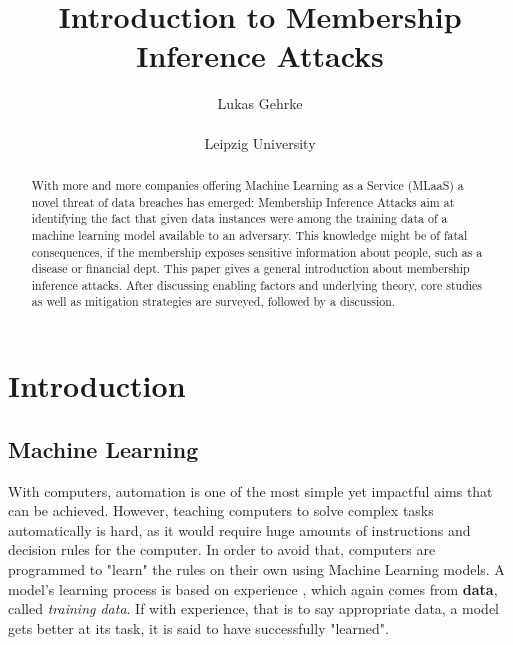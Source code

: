 \documentclass[runningheads]{llncs}
\begin{document}
%
\title{Introduction to Membership Inference Attacks}
%
%
\author{Lukas Gehrke \\
 \\
Leipzig University \\
}
%
%
%

\maketitle
%

\tableofcontents
\newpage

\begin{abstract} 
    With more and more companies offering Machine Learning as a Service (MLaaS) a novel threat of data breaches has emerged: Membership Inference Attacks aim at identifying the fact that given data instances were among the training data of a machine learning model available to an adversary. This knowledge might be of fatal consequences, if the membership exposes sensitive information about people, such as a disease or financial dept. This paper gives a general introduction about membership inference attacks. After discussing enabling factors and underlying theory, core studies as well as mitigation strategies are surveyed, followed by a discussion.
    
\end{abstract}
%
%
%
\section{Introduction}

\subsection{Machine Learning}

With computers, automation is one of the most simple yet impactful aims that can be achieved.
However, teaching computers to solve complex tasks automatically is hard, as it would require huge amounts of instructions and decision rules for the computer. In order to avoid that, computers are programmed to "learn" the rules on their own using Machine Learning models. A model's learning process is based on experience \cite{mitchell1997machinel}, which again comes from \textbf{data}, called \textit{training data}. If with experience, that is to say appropriate data, a model gets better at its task, it is said to have successfully "learned".
\end{document}
